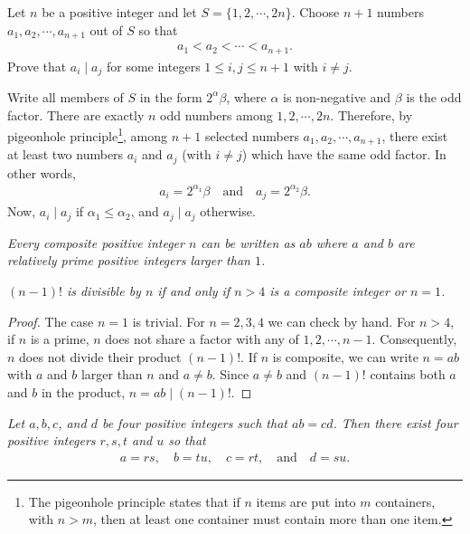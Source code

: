\documentclass{subfile}
\begin{document}
	\begin{problem}
		Let $n$ be a positive integer and let $S=\{1,2,\cdots,2n\}$. Choose $n+1$ numbers $a_1,a_2,\cdots, a_{n+1}$ out of $S$ so that
		\begin{align*}
			a_1<a_2<\cdots <a_{n+1}.
		\end{align*}
		Prove that $a_i\mid a_j$ for some integers $1 \leq i,j \leq n+1$ with $i\neq j$.
	\end{problem}

	\begin{solution}
		Write all members of $S$ in the form $2^{\alpha}\beta$, where $\alpha$ is non-negative and $\beta$ is the odd factor. There are exactly $n$ odd numbers among $1,2,\cdots,2n$. Therefore, by pigeonhole principle\footnote{The pigeonhole principle states that if $n$ items are put into $m$ containers, with $n > m$, then at least one container must contain more than one item.}, among $n+1$ selected numbers $a_1,a_2,\cdots, a_{n+1}$, there exist at least two numbers $a_i$ and $a_j$ (with $i\neq j$) which have the same odd factor. In other words,
		\begin{align*}
			a_i = 2^{\alpha_1}\beta \quad \text{and} \quad a_j = 2^{\alpha_2}\beta.
		\end{align*}
		Now, $a_i\mid a_j$ if $\alpha_1\leq \alpha_2$, and $a_j\mid a_j$ otherwise.
	\end{solution}

	\begin{theorem}\slshape
		Every composite positive integer $n$ can be written as $ab$ where $a$ and $b$ are relatively prime positive integers larger than $1$.
	\end{theorem}

	\begin{theorem}\slshape
		$(n-1)!$ is divisible by $n$ if and only if $n>4$ is a composite integer or $n=1$.\label{thm:cpfct}
	\end{theorem}

	\begin{proof}
		The case $n=1$ is trivial. For $n=2,3,4$ we can check by hand. For $n>4$, if $n$ is a prime, $n$ does not share a factor with any of $1,2,\cdots,n-1$. Consequently, $n$ does not divide their product $(n-1)!$. If $n$ is composite, we can write $n=ab$ with $a$ and $b$ larger than $n$ and $a\neq b$. Since $a\neq b$ and $(n-1)!$ contains both $a$ and $b$ in the product, $n=ab\mid (n-1)!$.
	\end{proof}

	\begin{theorem}\slshape
		Let $a, b, c$, and $d$ be four positive integers such that $ab=cd$. Then there exist four positive integers $r,s,t$ and $u$ so that
		\begin{align*}
			a = rs, \quad b = tu, \quad	c = rt, \quad \text{and}\quad d = su.
		\end{align*}
	\end{theorem}
\end{document}
